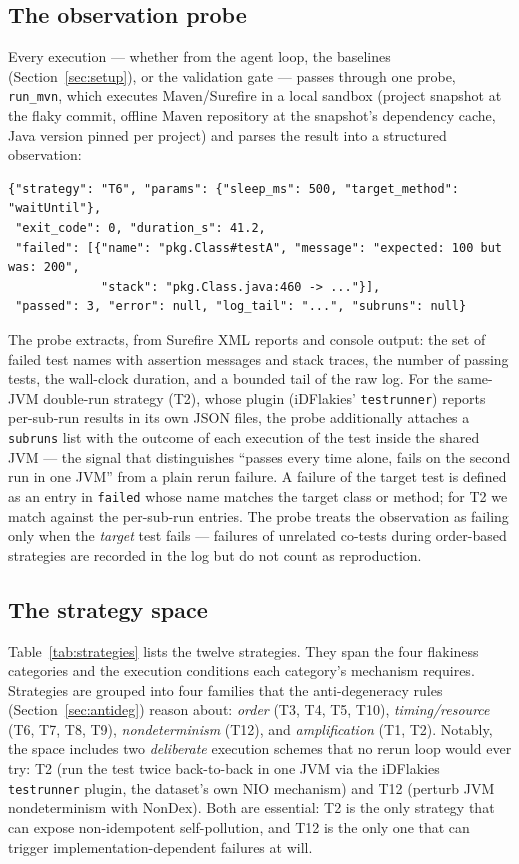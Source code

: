 \subsection{The observation probe}

Every execution — whether from the agent loop, the baselines
(Section~\ref{sec:setup}), or the validation gate — passes through one probe,
\texttt{run\_mvn}, which executes Maven/Surefire in a local sandbox
(project snapshot at the flaky commit, offline Maven repository at the
snapshot's dependency cache, Java version pinned per project) and parses the
result into a structured observation:

\begin{lstlisting}[style=jsonsmall,label=lst:obs]
{"strategy": "T6", "params": {"sleep_ms": 500, "target_method": "waitUntil"},
 "exit_code": 0, "duration_s": 41.2,
 "failed": [{"name": "pkg.Class#testA", "message": "expected: 100 but was: 200",
             "stack": "pkg.Class.java:460 -> ..."}],
 "passed": 3, "error": null, "log_tail": "...", "subruns": null}
\end{lstlisting}

The probe extracts, from Surefire XML reports and console output: the set of
failed test names with assertion messages and stack traces, the number of
passing tests, the wall-clock duration, and a bounded tail of the raw log.
For the same-JVM double-run strategy (T2), whose plugin (iDFlakies'
\texttt{testrunner}) reports per-sub-run results in its own JSON files, the
probe additionally attaches a \texttt{subruns} list with the outcome of each
execution of the test inside the shared JVM — the signal that distinguishes
``passes every time alone, fails on the second run in one JVM'' from a plain
rerun failure. A failure of the target test is defined as an entry in
\texttt{failed} whose name matches the target class or method; for T2 we
match against the per-sub-run entries. The probe treats the observation as
failing only when the \emph{target} test fails — failures of unrelated
co-tests during order-based strategies are recorded in the log but do not
count as reproduction.

\subsection{The strategy space}

Table~\ref{tab:strategies} lists the twelve strategies. They span the four
flakiness categories and the execution conditions each category's mechanism
requires. Strategies are grouped into four families that the anti-degeneracy
rules (Section~\ref{sec:antideg}) reason about: \emph{order} (T3, T4, T5,
T10), \emph{timing/resource} (T6, T7, T8, T9), \emph{nondeterminism} (T12),
and \emph{amplification} (T1, T2). Notably, the space includes two
\emph{deliberate} execution schemes that no rerun loop would ever try: T2
(run the test twice back-to-back in one JVM via the iDFlakies
\texttt{testrunner} plugin, the dataset's own NIO mechanism) and T12 (perturb
JVM nondeterminism with NonDex). Both are essential: T2 is the only strategy
that can expose non-idempotent self-pollution, and T12 is the only one that
can trigger implementation-dependent failures at will.

